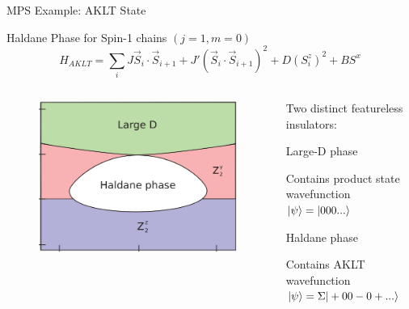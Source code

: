 \begin{frame}{MPS Example: AKLT State}
\vskip-1.5cm
\begin{block}{Haldane Phase for Spin-1 chains $(j=1, m=0)$}
\vskip-0.8cm
$$
H_{AKLT} = \sum\limits_{i} J \vec{S}_i\cdot \vec{S}_{i+1} + J' (\vec{S}_i\cdot \vec{S}_{i+1})^2 + D (S^z_i)^2+BS^x
$$
\end{block}
\begin{columns}[T]
    \begin{column}[T]{.45\textwidth}
        \vskip-1.2cm
        \begin{figure}
        \centering
        \includegraphics[width=\columnwidth]{diagrams/aklt2.png}
        \end{figure}
    \end{column}
    \begin{column}[T]{.55\textwidth}
    \vskip-0.8cm
    Two distinct featureless insulators:
    \bi 
    \item Large-D phase
    \bi 
    \item Contains product state wavefunction $\vert \psi \rangle = \vert 000... \rangle$ 
    \ei
    \item Haldane phase
    \bi 
    \item Contains AKLT wavefunction $\vert \psi \rangle = \Sigma\vert +00-0+... \rangle$
    \ei 
        \begin{figure}[h]
            \hspace{-2cm}
            \scalebox{1.2}{
            
            }
        \end{figure}

    \ei
    \end{column}
\end{columns}

\end{frame}